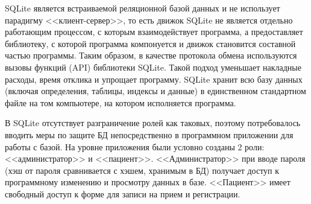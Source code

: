 SQLite является встраиваемой реляционной базой данных и не использует парадигму <<клиент-сервер>>, то есть движок SQLite не является отдельно работающим процессом, с которым взаимодействует программа, а предоставляет библиотеку, с которой программа компонуется и движок становится составной частью программы. Таким образом, в качестве протокола обмена используются вызовы функций (API) библиотеки SQLite. Такой подход уменьшает накладные расходы, время отклика и упрощает программу. SQLite хранит всю базу данных (включая определения, таблицы, индексы и данные) в единственном стандартном файле на том компьютере, на котором исполняется программа.\cite{sqlitedoc}

В SQLite отсутствует разграничение ролей как таковых, поэтому потребовалось вводить меры по защите БД непосредственно в программном приложении для работы с базой. На уровне приложения были условно созданы 2 роли: <<администратор>> и <<пациент>>. <<Администратор>> при вводе пароля (хэш от пароля сравнивается с хэшем, хранимым в БД) получает доступ к программному изменению и просмотру данных в базе. <<Пациент>> имеет свободный доступ к форме для записи на прием и регистрации.
